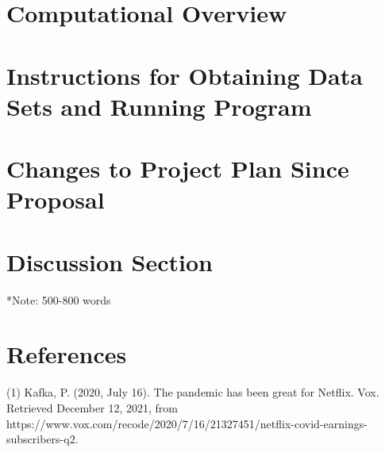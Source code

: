 \documentclass[fontsize=11pt]{article}
\begin{document}
\section{Computational Overview }



\section{Instructions for Obtaining Data Sets and Running Program}

\section{Changes to Project Plan Since Proposal}

\section{Discussion Section}
*Note: 500-800 words

\section{References}

(1) Kafka, P. (2020, July 16). The pandemic has been great for Netflix. Vox. Retrieved December 12, 2021, from https://www.vox.com/recode/2020/7/16/21327451/netflix-covid-earnings-subscribers-q2. 
\end{document}
